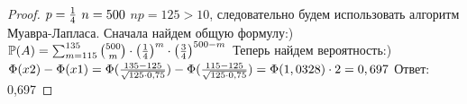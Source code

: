 \begin{proof}
$\newline p = \frac{1}{4}\newline$
$n = 500\newline$
$np = 125 > 10$, следовательно будем использовать алгоритм Муавра-Лапласа. Сначала найдем общую формулу:) $\mathbb{P}(A) = \sum_{m=115}^{135} {500 \choose m} \cdot \left(\frac{1}{4}\right)^m \cdot \left(\frac{3}{4}\right)^{500-m}\newline$
Теперь найдем вероятность:) $\Phi(x2) - \Phi(x1) = \Phi(\frac{135 - 125}{\sqrt{125 \cdot 0,75}}) - \Phi(\frac{115 - 125}{\sqrt{125 \cdot 0,75}}) = \Phi(1,0328) \cdot 2 = 0,697\newline$
\newline
Ответ: 0,697

\end{proof}